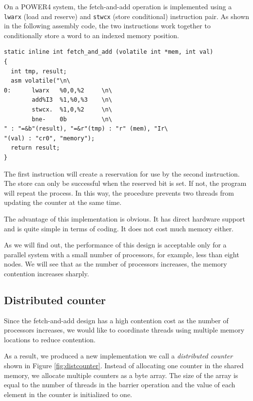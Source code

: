 On a POWER4 system, the fetch-and-add operation is implemented
using a \texttt{lwarx} (load and reserve) and \texttt{stwcx} (store conditional) instruction pair. As shown in the following assembly code, the
two instructions work together to conditionally store a word to an
indexed memory position.

{\small
\begin{verbatim}
static inline int fetch_and_add (volatile int *mem, int val)
{
  int tmp, result;
  asm volatile("\n\
0:      lwarx   %0,0,%2     \n\
        add%I3  %1,%0,%3    \n\
        stwcx.  %1,0,%2     \n\
        bne-    0b          \n\
" : "=&b"(result), "=&r"(tmp) : "r" (mem), "Ir\
"(val) : "cr0", "memory");
  return result;
}
\end{verbatim}
}

The first instruction will create a reservation for use by the second
instruction. The store can only be successful when the reserved bit is
set. If not, the program will repeat the process. In this
way, the procedure prevents two threads from updating the counter at the
same time.

The advantage of this implementation is obvious. It has direct
hardware support and is quite simple in terms of coding. It does not cost
much memory either. 

As we will find out, the performance of this design is acceptable only for a
parallel system with a small number of processors, for example, less
than eight nodes.  We will see that as the number of processors increases, the
memory contention increases sharply.

\subsection{Distributed counter}
\label{sec:distcounter}

Since the fetch-and-add design has a high contention cost as the number of
processors increases, we would like to coordinate threads using multiple memory locations to reduce contention.

As a result, we produced a new implementation we call a \emph{distributed counter} shown in 
Figure \ref{fig:distcounter}. Instead of allocating one
counter in the shared memory, we allocate multiple counters as a byte
array. The size of the array is equal to the number of threads in the
barrier operation and the value of each element in the
counter is initialized to one.

